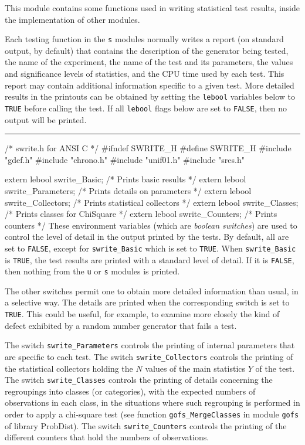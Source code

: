 
This module contains some functions used in writing statistical 
test results, inside the implementation of other modules.

Each testing function in the {\tt s} modules normally
writes a report (on standard output, by default) 
that contains the description of the generator being tested,
the name of the experiment, the name of the test and its parameters,
the values and significance levels of statistics,
and the CPU time used by each test.
This report may contain additional information specific to a given test.
More detailed results in the printouts can be obtained by setting 
the {\tt lebool} variables below to {\tt TRUE} before
calling the test. If all {\tt lebool} flags below are set to {\tt FALSE}, then
no output will be printed.


\bigskip\hrule
\code\hide
/* swrite.h for ANSI C */
#ifndef SWRITE_H
#define SWRITE_H
\endhide
#include "gdef.h"
#include "chrono.h"
#include "unif01.h"
#include "sres.h"
\endcode



\code

extern lebool swrite_Basic;           /* Prints basic results           */
extern lebool swrite_Parameters;      /* Prints details on parameters   */
extern lebool swrite_Collectors;      /* Prints statistical collectors  */
extern lebool swrite_Classes;         /* Prints classes for ChiSquare   */
extern lebool swrite_Counters;        /* Prints counters                */
\endcode
 \tab These environment variables (which are {\em boolean switches\/}) are used to 
  control the level of detail in the output printed by the tests. 
  By default, all are set to {\tt FALSE}, except for
  {\tt swrite\_Basic} which is set to {\tt TRUE}.
  When {\tt swrite\_Basic} is {\tt TRUE}, the test results are printed
  with a standard level of detail. 
  If it is {\tt FALSE}, then nothing from the  {\tt u} or  {\tt s}
  modules is printed.

  The other switches permit one to obtain more detailed information than 
  usual, in a selective way.  The details are printed when the 
  corresponding switch is set to {\tt TRUE}.
  This could be useful, for example, to examine more closely the kind of
  defect exhibited by a random number generator that fails a test.
  
  The switch {\tt swrite\_Parameters}  controls the printing of
  internal parameters that are specific to each test.
  The switch {\tt swrite\_Collectors} controls the printing of the 
  statistical collectors holding the $N$ values of the main statistics 
  $Y$ of the test.
  The switch {\tt swrite\_Classes} controls the printing of details 
  concerning the regroupings into classes (or categories),
  with the expected numbers of observations in each class,
  in the situations where such regrouping is performed in order 
  to apply a  chi-square test (see function  {\tt gofs\_MergeClasses}
  in module {\tt gofs} of library ProbDist).
  The switch {\tt swrite\_Counters} controls the printing of the different
  counters that hold the numbers of observations.
 \endtab
\code


